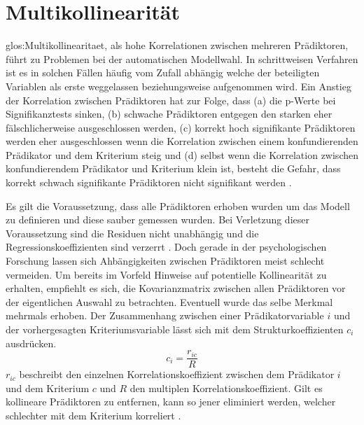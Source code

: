 \section{Multikollinearität}
\Gls{glos:Multikollinearitaet}, als hohe Korrelationen zwischen mehreren Prädiktoren, führt zu Problemen bei der automatischen Modellwahl. 
In schrittweisen Verfahren ist es in solchen Fällen häufig vom Zufall abhängig welche der beteiligten Variablen als erste weggelassen beziehungsweise aufgenommen wird. 
Ein Anstieg der Korrelation zwischen Prädiktoren hat zur Folge, dass (a) die p-Werte bei Signifikanztests sinken, (b) schwache Prädiktoren entgegen den starken eher fälschlicherweise ausgeschlossen werden, (c) korrekt hoch signifikante Prädiktoren werden eher ausgeschlossen wenn die Korrelation zwischen einem konfundierenden Prädikator und dem Kriterium steig und (d) selbst wenn die Korrelation zwischen konfundierendem Prädikator und Kriterium klein ist, besteht die Gefahr, dass korrekt schwach signifikante Prädiktoren nicht signifikant werden \cite[p. 2810]{graham2003confronting}.

Es gilt die Voraussetzung, dass alle Prädiktoren erhoben wurden um das Modell zu definieren und diese sauber gemessen wurden. Bei Verletzung dieser Voraussetzung sind die Residuen nicht unabhängig und die Regressionskoeffizienten sind verzerrt \cite[p. 119]{jacob2003applied}.
Doch gerade in der psychologischen Forschung lassen sich Ahbängigkeiten zwischen Prädiktoren meist schlecht vermeiden.
Um bereits im Vorfeld Hinweise auf potentielle Kollinearität zu erhalten, empfiehlt es sich, die Kovarianzmatrix zwischen allen Prädiktoren vor der eigentlichen Auswahl zu betrachten.
Eventuell wurde das selbe Merkmal mehrmals erhoben.
Der Zusammenhang zwischen einer Prädikatorvariable $i$ und der vorhergesagten Kriteriumsvariable lässt sich mit dem Strukturkoeffizienten $c_i$ ausdrücken.
\begin{equation}
c_i = \frac{r_{ic}}{R}
\tag{Strukturkoeffizient}
\end{equation}
$r_{ic}$ beschreibt den einzelnen Korrelationskoeffizient zwischen dem Prädikator $i$ und dem Kriterium $c$ und $R$ den multiplen Korrelationskoeffizient. 
Gilt es kollineare Prädiktoren zu entfernen, kann so jener eliminiert werden, welcher schlechter mit dem Kriterium korreliert \cite[S. 453]{bortz2011}. 
